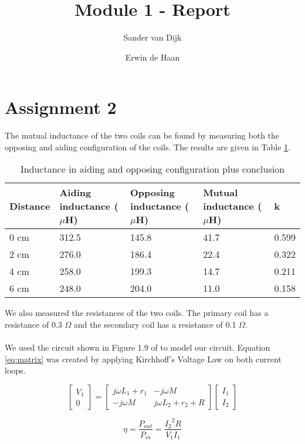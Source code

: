 \documentclass[final]{scrreprt} %
\title{Module 1 - Report}
\author{Sander {van Dijk} \and Erwin {de Haan}}
\begin{document}
\chapter*{Assignment 2}
The mutual inductance of the two coils can be found by measuring both the opposing and aiding configuration of the coils. The results are given in Table \ref{tab:inductances}.

\begin{table} [h]
\begin{center}
	\begin{tabular}{ l | l | l | l | l }
	Distance & Aiding inductance ($\mu$H) & Opposing inductance ($\mu$H) & Mutual inductance ($\mu$H) & k \\ \hline
  	0 cm & 312.5 & 145.8 & 41.7 & 0.599 \\
	2 cm & 276.0 & 186.4 & 22.4 & 0.322 \\
	4 cm & 258.0 & 199.3 & 14.7 & 0.211 \\
	6 cm & 248.0 & 204.0 & 11.0 & 0.158 \\
	\end{tabular}
	\caption{Inductance in aiding and opposing configuration plus conclusion}
	\label{tab:inductances}
\end{center}
\end{table}

We also measured the resistances of the two coils. The primary coil has a resistance of 0.3 $\Omega$ and the secondary coil has a resistance of 0.1 $\Omega$.
\\ \\
We used the circuit shown in Figure 1.9 of \cite{epo4-manual} to model our circuit. Equation \ref{eq:matrix} was created by applying Kirchhoff's Voltage Law on both current loops.

\begin{equation}
	\begin{bmatrix}
		V_1 \\
		0
	\end{bmatrix} =
	\begin{bmatrix}
		j \omega L_1 + r_1 & -j \omega M \\
		-j \omega M & j \omega L_2 + r_2 + R
	\end{bmatrix}
	\begin{bmatrix}
		I_1 \\
		I_2
	\end{bmatrix}
	\label{eq:matrix}
\end{equation}

\begin{equation}
	\eta = \frac{P_{out}}{P_{in}} = \frac{{I_2}^2 R}{V_1 I_1}
	\label{eq:efficiency}
\end{equation}
\end{document}

